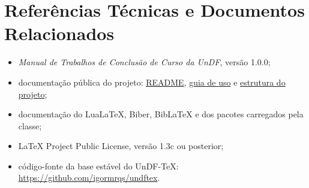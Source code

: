\documentclass[12pt,a4paper,oneside]{report}
\begin{document}
\manualmainmatter














\appendix


\chapter*{Referências Técnicas e Documentos Relacionados}

\begin{itemize}
  \item \emph{Manual de Trabalhos de Conclusão de Curso da UnDF}, versão 1.0.0;
  \item documentação pública do projeto: \href{https://github.com/igormrqs/undftex/blob/feature/perfis-tcc/README.md}{README}, \href{https://github.com/igormrqs/undftex/blob/feature/perfis-tcc/docs/guia-de-uso.md}{guia de uso} e \href{https://github.com/igormrqs/undftex/blob/feature/perfis-tcc/docs/estrutura-do-projeto.md}{estrutura do projeto};
  \item documentação do LuaLaTeX, Biber, BibLaTeX e dos pacotes carregados pela classe;
  \item LaTeX Project Public License, versão 1.3c ou posterior;
  \item código-fonte da base estável do UnDF-TeX: \url{https://github.com/igormrqs/undftex}.
\end{itemize}


\end{document}
